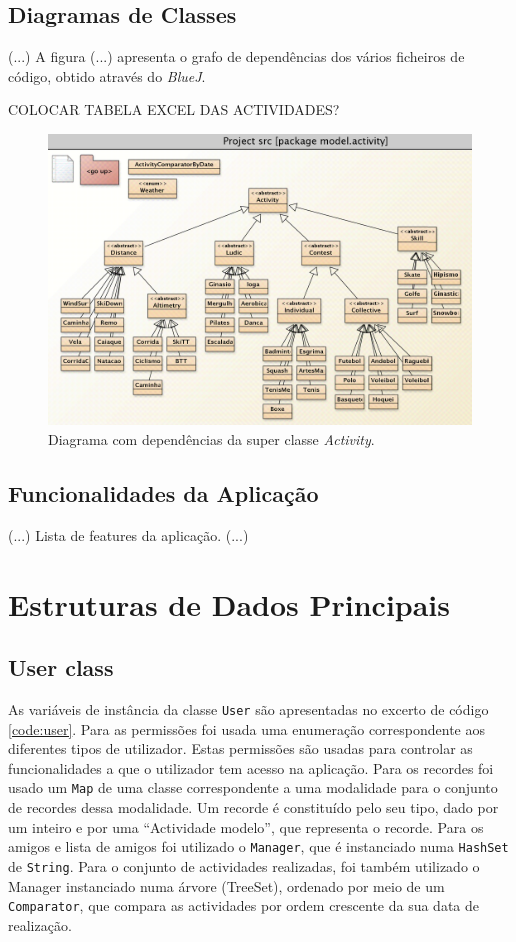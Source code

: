 \documentclass[a4paper,10pt]{report}
\begin{document}
\section{Diagramas de Classes}
\label{sec:classes}
(...)
A figura (...) apresenta o grafo de dependências dos vários ficheiros de código, obtido através do \emph{BlueJ}.

COLOCAR TABELA EXCEL DAS ACTIVIDADES?

\begin{figure}
\centering
\includegraphics[width=\textwidth]{diagramaActivities.png}
\caption{Diagrama com dependências da super classe \emph{Activity}.}
\label{fig:activityDiagram}
\end{figure}

\section{Funcionalidades da Aplicação}
\label{sec:funcionalidades}
(...)
Lista de features da aplicação.
(...)

\chapter{Estruturas de Dados Principais}
\label{cap:estruturas}
\section{User class}
\label{sec:user}
As variáveis de instância da classe \verb!User! são apresentadas no excerto de código \ref{code:user}.
Para as permissões foi usada uma enumeração correspondente aos diferentes tipos de utilizador. 
Estas permissões são usadas para controlar as funcionalidades a que o utilizador tem acesso na aplicação.
Para os recordes foi usado um \verb!Map! de uma classe correspondente a uma modalidade para o conjunto de recordes dessa modalidade. 
Um recorde é constituído pelo seu tipo, dado por um inteiro e por uma ``Actividade modelo'', que representa o recorde.
Para os amigos e lista de amigos foi utilizado o \verb!Manager!, que é instanciado numa \verb!HashSet! de \verb!String!.
Para o conjunto de actividades realizadas, foi também utilizado o Manager instanciado numa árvore (TreeSet), ordenado por meio 
de um \verb!Comparator!, que compara as actividades por ordem crescente da sua data de realização.
\end{document}
